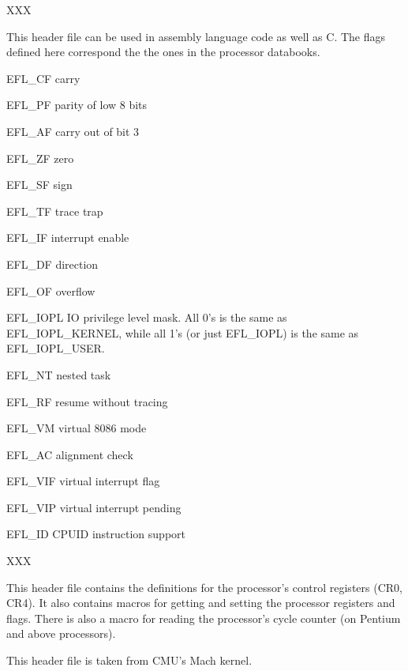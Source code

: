\begin{apisyn}
\end{apisyn}
\begin{apidesc}
	XXX

	This header file can be used in assembly language code as well as C.
	The flags defined here correspond the the ones in the processor
	databooks.

	\begin{icsymlist}
	\item [EFL_CF]
		carry
	\item [EFL_PF]
		parity of low 8 bits
	\item [EFL_AF]
		carry out of bit 3
	\item [EFL_ZF]
		zero
	\item [EFL_SF]
		sign
	\item [EFL_TF]
		trace trap
	\item [EFL_IF]
		interrupt enable
	\item [EFL_DF]
		direction
	\item [EFL_OF]
		overflow
	\item [EFL_IOPL]
		IO privilege level mask.
		All 0's is the same as EFL_IOPL_KERNEL,
		while all 1's (or just EFL_IOPL) is the same as EFL_IOPL_USER.
	\item [EFL_NT]
		nested task
	\item [EFL_RF]
		resume without tracing
	\item [EFL_VM]
		virtual 8086 mode
	\item [EFL_AC]
		alignment check
	\item [EFL_VIF]
		virtual interrupt flag
	\item [EFL_VIP]
		virtual interrupt pending
	\item [EFL_ID]
		CPUID instruction support
	\end{icsymlist}
\end{apidesc}

\begin{apisyn}
\end{apisyn}
\begin{apidesc}
	XXX

	This header file contains the definitions for the processor's
	control registers (CR0, CR4).
	It also contains macros for getting and setting the
	processor registers and flags.
	There is also a macro for reading the processor's
	cycle counter (on Pentium and above processors).

	This header file is taken from CMU's Mach kernel.
\end{apidesc}


